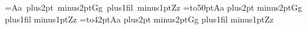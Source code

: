 %
%
\def\boxcontents{Aa\hskip 5pt plus2pt minus2ptGg\hskip 3pt plus1fil minus1ptZz}%
=\hbox{\boxcontents}%
\number{} \number{} \number{} %
=\hbox to50pt{\boxcontents}%
\number{} %
=\hbox to42pt{\boxcontents}%
\number{} %
